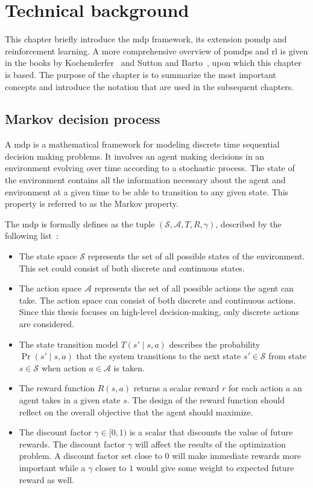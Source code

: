 \chapter{Technical background}\label{ch:background}
This chapter briefly introduce the \gls{mdp} framework, its extension \gls{pomdp} and reinforcement learning. A more comprehensive overview of \gls{pomdp}s and \gls{rl} is given in the books by Kochenderfer~\cite{Kochenderfer2015} and Sutton and Barto~\cite{Sutton2018}, upon which this chapter is based. The purpose of the chapter is to summarize the most important concepts and introduce the notation that are used in the subsequent chapters. 

\section{Markov decision process}\label{sec:background_mdp}
A \gls{mdp} is a mathematical framework for modeling discrete time sequential decision making problems. It involves an agent making decisions in an environment evolving over time according to a stochastic process. The state of the environment contains all the information necessary about the agent and environment at a given time to be able to transition to any given state. This property is referred to as the Markov property. 

The \gls{mdp} is formally defines as the tuple $( \mathcal{S}, \mathcal{A}, T, R, \gamma )$, described by the following list~\cite{Kochenderfer2015}:
\begin{itemize}
    \item The state space $\mathcal{S}$ represents the set of all possible states of the environment. This set could consist of both discrete and continuous states.
    \item The action space $\mathcal{A}$ represents the set of all possible actions the agent can take. The action space can  consist of both discrete and continuous actions. Since this thesis focuses on high-level decision-making, only discrete actions are considered.
    \item The state transition model $T(s' \mid s,a)$ describes the probability $\Pr(s' \mid s,a)$ that the system transitions to the next state $s' \in \mathcal{S}$ from state $s \in \mathcal{S}$ when action $a \in \mathcal{A}$ is taken.
    \item The reward function $R(s,a)$ returns a scalar reward $r$ for each action $a$ an agent takes in a given state $s$. The design of the reward function should reflect on the overall objective that the agent should maximize.
    \item The discount factor $\gamma \in [0,1)$ is a scalar that discounts the value of future rewards. The discount factor $\gamma$ will affect the results of the optimization problem. A discount factor set close to $0$ will make immediate rewards more important while a $\gamma$ closer to $1$ would give some weight to expected future reward as well. 
\end{itemize}

